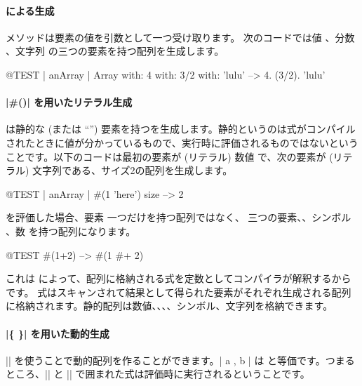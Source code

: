 \documentclass[a4paper,10pt,twoside]{book}
\begin{document}
\paragraph{ による生成}  メソッドは要素の値を引数として一つ受け取ります。
次のコードでは値 、分数 、文字列  の三つの要素を持つ配列を生成します。

\begin{code}{@TEST | anArray |}
Array with: 4 with: 3/2 with: 'lulu' -->  {4. (3/2). 'lulu'}
\end{code}

\paragraph{\ct|\#()| を用いたリテラル生成}
\ct{#()} は静的な (または ``'') 要素を持つを生成します。静的というのは式がコンパイルされたときに値が分かっているもので、実行時に評価されるものではないということです。以下のコードは最初の要素が (リテラル) 数値  で、次の要素が (リテラル) 文字列である、サイズ2の配列を生成します。


\begin{code}{@TEST | anArray |}
#(1 'here') size --> 2
\end{code}

 を評価した場合、要素  一つだけを持つ配列ではなく、 \ie 三つの要素、、シンボル \ct{#+}、数  を持つ配列になります。

\begin{code}{@TEST}
#(1+2) -->  #(1 #+ 2)
\end{code}

\noindent
これは \ct{#()} によって、配列に格納される式を定数としてコンパイラが解釈するからです。\ct{#()} 式はスキャンされて結果として得られた要素がそれぞれ生成される配列に格納されます。静的配列は数値、、、、シンボル、文字列を格納できます。

\paragraph{\ct|\{ \}| を用いた動的生成}
\ct|{}| を使うことで動的配列を作ることができます。\ct|{ a , b }| は  と等価です。つまるところ、\ct|{| と \ct|}| で囲まれた式は評価時に実行されるということです。
\end{document}
